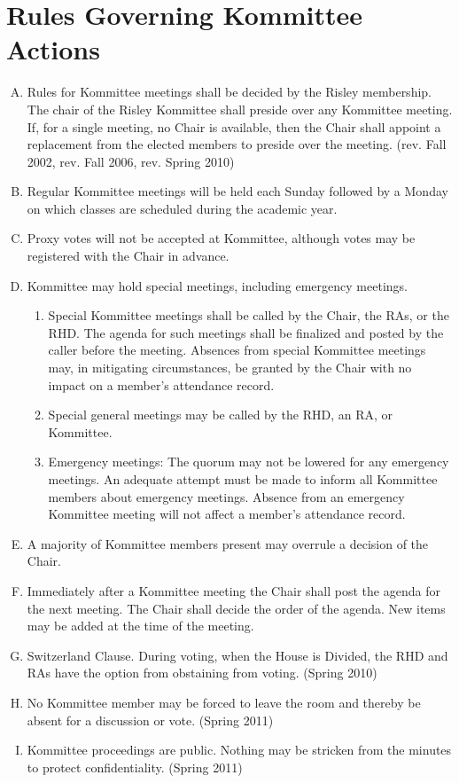 \documentclass[12pt]{article}
\begin{document}
\section{Rules Governing Kommittee Actions}
\begin{enumerate}[A.]
\item Rules for Kommittee meetings shall be decided by the Risley membership. The chair of the Risley Kommittee shall preside over any Kommittee meeting. If, for a single meeting, no Chair is available, then the Chair shall appoint a replacement from the elected members to preside over the meeting. (rev. Fall 2002, rev. Fall 2006, rev. Spring 2010)
\item Regular Kommittee meetings will be held each Sunday followed by a Monday on which classes are scheduled during the academic year.
\item Proxy votes will not be accepted at Kommittee, although votes may be registered with the Chair in advance.
\item Kommittee may hold special meetings, including emergency meetings.
\begin{enumerate}[1.]
\item Special Kommittee meetings shall be called by the Chair, the RAs, or the RHD. The agenda for such meetings shall be finalized and posted by the caller before the meeting. Absences from special Kommittee meetings may, in mitigating circumstances, be granted by the Chair with no impact on a member's attendance record.
\item Special general meetings may be called by the RHD, an RA, or Kommittee.
\item Emergency meetings: The quorum may not be lowered for any emergency meetings. An adequate attempt must be made to inform all Kommittee members about emergency meetings. Absence from an emergency Kommittee meeting will not affect a member's attendance record.
\end{enumerate}
\item A majority of Kommittee members present may overrule a decision of the Chair.
\item Immediately after a Kommittee meeting the Chair shall post the agenda for the next meeting. The Chair shall decide the order of the agenda. New items may be added at the time of the meeting.
\item Switzerland Clause. During voting, when the House is Divided, the RHD and RAs have the option from obstaining from voting. (Spring 2010)
\item No Kommittee member may be forced to leave the room and thereby be absent for a discussion or vote. (Spring 2011)
\item Kommittee proceedings are public. Nothing may be stricken from the minutes to protect confidentiality. (Spring 2011)
\end{enumerate}
\end{document}
